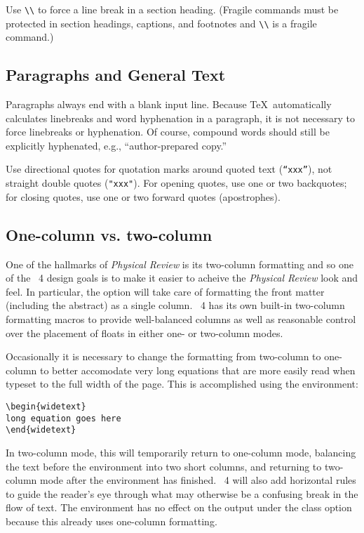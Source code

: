 \documentclass[%
 ,twocolumn%
 ,secnumarabic%
,amssymb, amsmath,nobibnotes, aps, prl]{revtex4}
\begin{document}
Use \cmd\protect\verb+\\+ to force a line break in a section heading.
(Fragile commands must be protected in section headings, captions, and
footnotes and \verb+\\+ is a fragile command.)

\subsection{Paragraphs and General Text}

Paragraphs always end with a blank input line.  Because \TeX\
automatically calculates linebreaks and word hyphenation in a
paragraph, it is not necessary to force linebreaks or hyphenation.  Of
course, compound words should still be explicitly hyphenated, e.g.,
``author-prepared copy.''

Use directional quotes for quotation marks around quoted text
(\texttt{``xxx''}), not straight double quotes (\texttt{"xxx"}).
For opening quotes, use one or two backquotes; for closing quotes,
use one or two forward quotes (apostrophes).

\subsection{One-column vs. two-column}\label{sec:widetext}

One of the hallmarks of \textit{Physical Review} is its two-column
formatting and so one of the \revtex~4 design goals is to make it easier to
acheive the \textit{Physical Review} look and feel. In particular, the
\classoption{twocolumn} option will take care of formatting the front matter
(including the abstract) as a single column. \revtex~4 has its own
built-in two-column formatting macros to provide well-balanced columns
as well as reasonable control over the placement of floats in either
one- or two-column modes.

Occasionally it is necessary to change the formatting from two-column to
one-column to better accomodate very long equations that are more
easily read when typeset to the full width of the page. This is
accomplished using the  environment:
\begin{verbatim}
\begin{widetext}
long equation goes here
\end{widetext}
\end{verbatim}
In two-column mode, this will temporarily return to one-column mode,
balancing the text before the environment into two short columns, and
returning to two-column mode after the environment has
finished. \revtex~4 will also add horizontal rules to guide the
reader's eye through what may otherwise be a confusing break in the
flow of text. The
 environment has no effect on the output under the 
\classoption{preprint} class option because this already uses
one-column formatting.
\end{document}
